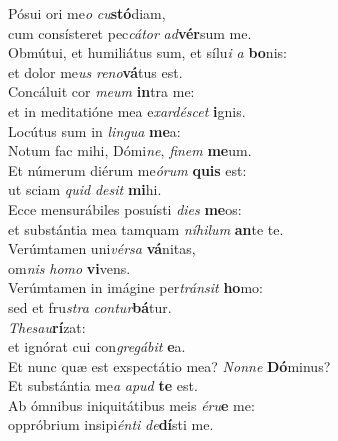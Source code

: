 \evenverse Pósui ori me\textit{o} \textit{cu}\textbf{stó}diam,~\*\\
\evenverse cum consísteret pec\textit{cá}\textit{tor} \textit{ad}\textbf{vér}sum me.\\
\oddverse Obmútui, et humiliátus sum, et sílu\textit{i} \textit{a} \textbf{bo}nis:~\*\\
\oddverse et dolor me\textit{us} \textit{re}\textit{no}\textbf{vá}tus est.\\
\evenverse Concáluit cor \textit{me}\textit{um} \textbf{in}tra me:~\*\\
\evenverse et in meditatióne mea e\textit{xar}\textit{dé}\textit{scet} \textbf{i}gnis.\\
\oddverse Locútus sum in \textit{lin}\textit{gua} \textbf{me}a:~\*\\
\oddverse Notum fac mihi, Dómi\textit{ne}, \textit{fi}\textit{nem} \textbf{me}um.\\
\evenverse Et númerum diérum me\textit{ó}\textit{rum} \textbf{quis} est:~\*\\
\evenverse ut sciam \textit{quid} \textit{de}\textit{sit} \textbf{mi}hi.\\
\oddverse Ecce mensurábiles posuísti \textit{di}\textit{es} \textbf{me}os:~\*\\
\oddverse et substántia mea tamquam \textit{ní}\textit{hi}\textit{lum} \textbf{an}te te.\\
\evenverse Verúmtamen uni\textit{vér}\textit{sa} \textbf{vá}nitas,~\*\\
\evenverse om\textit{nis} \textit{ho}\textit{mo} \textbf{vi}vens.\\
\oddverse Verúmtamen in imágine per\textit{trán}\textit{sit} \textbf{ho}mo:~\*\\
\oddverse sed et fru\textit{stra} \textit{con}\textit{tur}\textbf{bá}tur.\\
\evenverse \textit{The}\textit{sau}\textbf{rí}zat:~\*\\
\evenverse et ignórat cui con\textit{gre}\textit{gá}\textit{bit} \textbf{e}a.\\
\oddverse Et nunc quæ est exspectátio mea? \textit{Non}\textit{ne} \textbf{Dó}minus?~\*\\
\oddverse Et substántia me\textit{a} \textit{a}\textit{pud} \textbf{te} est.\\
\evenverse Ab ómnibus iniquitátibus meis \textit{é}\textit{ru}\textbf{e} me:~\*\\
\evenverse oppróbrium insipi\textit{én}\textit{ti} \textit{de}\textbf{dí}sti me.\\
